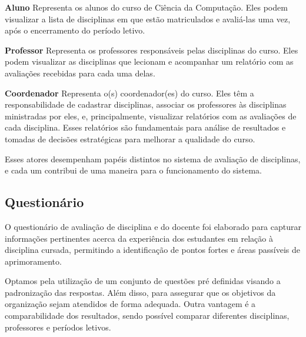 \begin{alineas}
  \item \textbf{Aluno} Representa os alunos do curso de Ciência da Computação. Eles podem visualizar a lista de disciplinas em que estão matriculados e avaliá-las uma vez, após o encerramento do período letivo.
  \item \textbf{Professor} Representa os professores responsáveis pelas disciplinas do curso. Eles podem visualizar as disciplinas que lecionam e acompanhar um relatório com as avaliações recebidas para cada uma delas.
  \item \textbf{Coordenador} Representa o(s) coordenador(es) do curso. Eles têm a responsabilidade de cadastrar disciplinas, associar os professores às disciplinas ministradas por eles, e, principalmente, visualizar relatórios com as avaliações de cada disciplina. Esses relatórios são fundamentais para análise de resultados e tomadas de decisões estratégicas para melhorar a qualidade do curso.
\end{alineas}

Esses atores desempenham papéis distintos no sistema de avaliação de disciplinas, e cada um contribui de uma maneira para o funcionamento do sistema.

\subsection{Questionário}

O questionário de avaliação de disciplina e do docente foi elaborado para capturar informações pertinentes acerca da experiência dos estudantes em relação à disciplina cursada, permitindo a identificação de pontos fortes e áreas passíveis de aprimoramento.

Optamos pela utilização de um conjunto de questões pré definidas visando a padronização das respostas. Além disso, para assegurar que os objetivos da organização sejam atendidos de forma adequada. Outra vantagem é a comparabilidade dos resultados, sendo possível comparar diferentes disciplinas, professores e períodos letivos.


